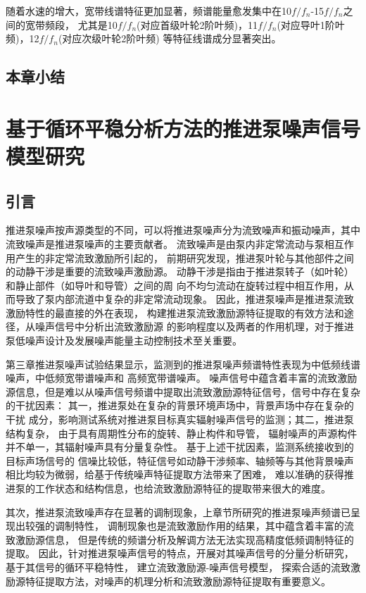 随着水速的增大，宽带线谱特征更加显著，频谱能量愈发集中在10$f/f_n$-15$f/f_n$之间的宽带频段，
尤其是10$f/f_n$(对应首级叶轮2阶叶频)，11$f/f_n$(对应导叶1阶叶频)，12$f/f_n$(对应次级叶轮2阶叶频)
等特征线谱成分显著突出。
\section{本章小结}
\chapter{基于循环平稳分析方法的推进泵噪声信号模型研究}
\section{引言}
推进泵噪声按声源类型的不同，可以将推进泵噪声分为流致噪声和振动噪声，其中流致噪声是推进泵噪声的主要贡献者。
流致噪声是由泵内非定常流动与泵相互作用产生的非定常流致激励所引起的，
前期研究发现，推进泵叶轮与其他部件之间的动静干涉是重要的流致噪声激励源。
动静干涉是指由于推进泵转子（如叶轮）和静止部件（如导叶和导管）之间的周
向不均匀流动在旋转过程中相互作用，从而导致了泵内部流道中复杂的非定常流动现象。
因此，推进泵噪声是推进泵流致激励特性的最直接的外在表现，
构建推进泵流致激励源特征提取的有效方法和途径，从噪声信号中分析出流致激励源
的影响程度以及两者的作用机理，对于推进泵低噪声设计及发展噪声能量主动控制技术至关重要。

第三章推进泵噪声试验结果显示，监测到的推进泵噪声频谱特性表现为中低频线谱噪声，中低频宽带谱噪声和
高频宽带谱噪声。
噪声信号中蕴含着丰富的流致激励源信息，但是难以从噪声信号频谱中提取出流致激励源特征信号，信号中存在复杂的干扰因素：
其一，推进泵处在复杂的背景环境声场中，背景声场中存在复杂的干扰
成分，影响测试系统对推进泵目标真实辐射噪声信号的监测；其二，推进泵结构复杂，
由于具有周期性分布的旋转、静止构件和导管，
辐射噪声的声源构件并不单一，其辐射噪声具有分量复杂性。
基于上述干扰因素，监测系统接收到的目标声场信号的
信噪比较低，特征信号如动静干涉频率、轴频等与其他背景噪声相比均较为微弱，给基于传统噪声特征提取方法带来了困难，
难以准确的获得推进泵的工作状态和结构信息，也给流致激励源特征的提取带来很大的难度。

其次，推进泵流致噪声存在显著的调制现象，上章节所研究的推进泵噪声频谱已呈现出较强的调制特性，
调制现象也是流致激励作用的结果，其中蕴含着丰富的流致激励源信息，
但是传统的频谱分析及解调方法无法实现高精度低频调制特征的提取。
因此，针对推进泵噪声信号的特点，开展对其噪声信号的分量分析研究，
基于其信号的循环平稳特性，
建立流致激励源-噪声信号模型，
探索合适的流致激励源特征提取方法，对噪声的机理分析和流致激励源特征提取有重要意义。
